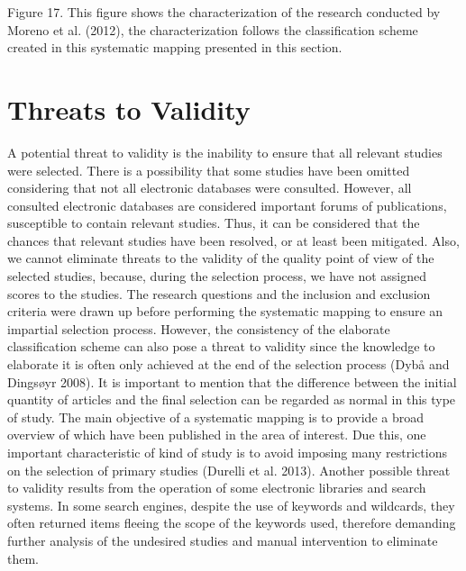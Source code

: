 Figure 17. This figure shows the characterization of the research conducted by Moreno et al. (2012), the characterization follows the classification scheme created in this systematic mapping presented in this section. 

\section{Threats to Validity}

A potential threat to validity is the inability to ensure that all relevant studies were selected. There is a possibility that some studies have been omitted considering that not all electronic databases were consulted. However, all consulted electronic databases are considered important forums of publications, susceptible to contain relevant studies. Thus, it can be considered that the chances that relevant studies have been resolved, or at least been mitigated. Also, we cannot eliminate threats to the validity of the quality point of view of the selected studies, because, during the selection process, we have not assigned scores to the studies.
The research questions and the inclusion and exclusion criteria were drawn up before performing the systematic mapping to ensure an impartial selection process. However, the consistency of the elaborate classification scheme can also pose a threat to validity since the knowledge to elaborate it is often only achieved at the end of the selection process (Dybå and Dingsøyr 2008).
It is important to mention that the difference between the initial quantity of articles and the final selection can be regarded as normal in this type of study. The main objective of a systematic mapping is to provide a broad overview of which have been published in the area of interest. Due this, one important characteristic of kind of study is to avoid imposing many restrictions on the selection of primary studies (Durelli et al. 2013).
Another possible threat to validity results from the operation of some electronic libraries and search systems. In some search engines, despite the use of keywords and wildcards, they often returned items fleeing the scope of the keywords used, therefore demanding further analysis of the undesired studies and manual intervention to eliminate them.

